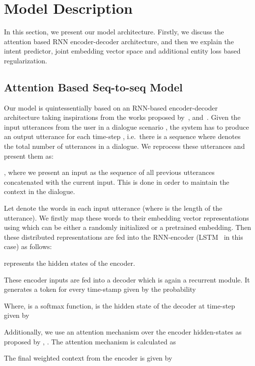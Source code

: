 \documentclass[runningheads]{llncs}
\begin{document}
\section{Model Description}
In this section, we present our model architecture. Firstly, we discuss the attention based RNN encoder-decoder architecture, and then we explain the intent predictor, joint embedding vector space and additional entity loss based regularization.

\subsection{Attention Based Seq-to-seq Model}
Our model is quintessentially based on an RNN-based encoder-decoder architecture taking inspirations from the works proposed by~\cite{vinyals2015neural}, \cite{shang2015neural} and~\cite{luong2014address}. Given the input utterances from the user in a dialogue scenario , the system has to produce an output utterance  for each time-step , i.e.~there is a sequence  where  denotes the total number of utterances in a dialogue. We reprocess these utterances and present them as:

,    
where we present an input as the sequence of all previous utterances concatenated with the current input. This is done in order to maintain the context in the dialogue.

Let  denote the words in each input utterance (where  is the length of the utterance). We firstly map these words to their embedding vector representations using  which can be either a randomly initialized or a pretrained embedding. Then these distributed representations are fed into the RNN-encoder (LSTM~\cite{hochreiter1997long} in this case) as follows:

\noindent
 represents the hidden states of the encoder.

These encoder inputs are fed into a decoder which is again a recurrent module. It generates a token for every time-stamp  given by the probability


\noindent
Where,  is a softmax function,  is the hidden state of the decoder at time-step  given by



Additionally, we use an attention mechanism over the encoder hidden-states as proposed by \cite{bahdanau2014neural}, \cite{graves2015generating}. 
The attention mechanism is calculated as




The final weighted context from the encoder is given by
\end{document}
